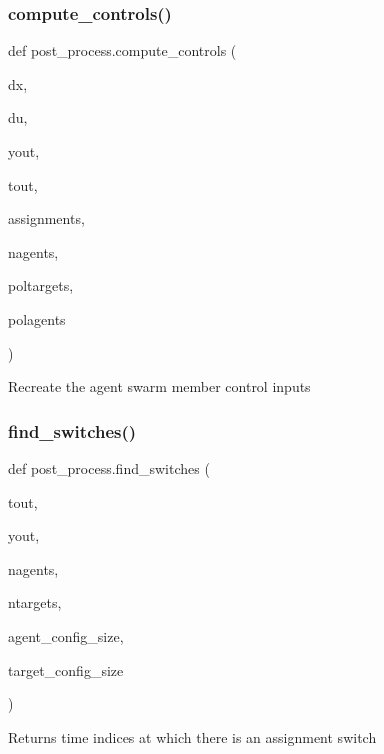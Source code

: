 \subsubsection{\texorpdfstring{compute\_controls()}{compute\_controls()}}
{\footnotesize\ttfamily def post\+\_\+process.\+compute\+\_\+controls (\begin{DoxyParamCaption}\item[{}]{dx,  }\item[{}]{du,  }\item[{}]{yout,  }\item[{}]{tout,  }\item[{}]{assignments,  }\item[{}]{nagents,  }\item[{}]{poltargets,  }\item[{}]{polagents }\end{DoxyParamCaption})}

\begin{DoxyVerb}Recreate the agent swarm member control inputs\end{DoxyVerb}
 \mbox{\label{namespacepost__process_a1192f5e66dab82fd1c9a577784853d38}} 
\subsubsection{\texorpdfstring{find\_switches()}{find\_switches()}}
{\footnotesize\ttfamily def post\+\_\+process.\+find\+\_\+switches (\begin{DoxyParamCaption}\item[{}]{tout,  }\item[{}]{yout,  }\item[{}]{nagents,  }\item[{}]{ntargets,  }\item[{}]{agent\+\_\+config\+\_\+size,  }\item[{}]{target\+\_\+config\+\_\+size }\end{DoxyParamCaption})}

\begin{DoxyVerb}Returns time indices at which there is an assignment switch\end{DoxyVerb}
 \mbox{\label{namespacepost__process_a390cea7e2e66550ffd937f5e22d641cb}} 
